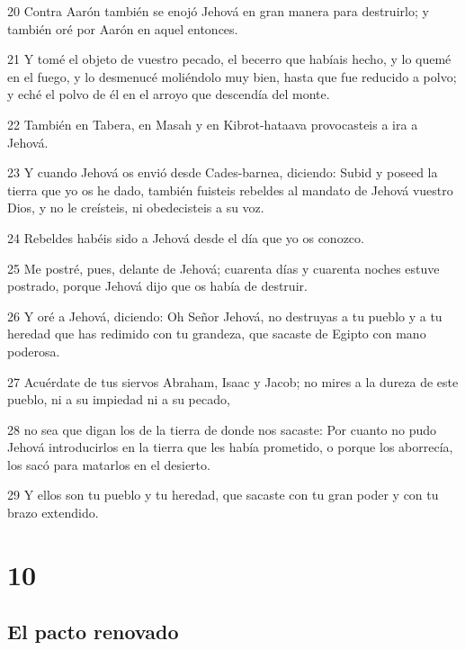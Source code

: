 \par 20 Contra Aarón también se enojó Jehová en gran manera para destruirlo; y también oré por Aarón en aquel entonces.
\par 21 Y tomé el objeto de vuestro pecado, el becerro que habíais hecho, y lo quemé en el fuego, y lo desmenucé moliéndolo muy bien, hasta que fue reducido a polvo; y eché el polvo de él en el arroyo que descendía del monte.
\par 22 También en Tabera, en Masah y en Kibrot-hataava  provocasteis a ira a Jehová.
\par 23 Y cuando Jehová os envió desde Cades-barnea, diciendo: Subid y poseed la tierra que yo os he dado, también fuisteis rebeldes al mandato de Jehová vuestro Dios, y no le creísteis, ni obedecisteis a su voz.
\par 24 Rebeldes habéis sido a Jehová desde el día que yo os conozco.
\par 25 Me postré, pues, delante de Jehová; cuarenta días y cuarenta noches estuve postrado, porque Jehová dijo que os había de destruir.
\par 26 Y oré a Jehová, diciendo: Oh Señor Jehová, no destruyas a tu pueblo y a tu heredad que has redimido con tu grandeza, que sacaste de Egipto con mano poderosa.
\par 27 Acuérdate de tus siervos Abraham, Isaac y Jacob; no mires a la dureza de este pueblo, ni a su impiedad ni a su pecado,
\par 28 no sea que digan los de la tierra de donde nos sacaste: Por cuanto no pudo Jehová introducirlos en la tierra que les había prometido, o porque los aborrecía, los sacó para matarlos en el desierto.
\par 29 Y ellos son tu pueblo y tu heredad, que sacaste con tu gran poder y con tu brazo extendido.

\chapter{10}

\section{El pacto renovado}

